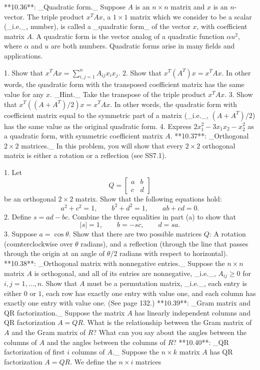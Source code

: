 

**10.36**: _Quadratic form._ Suppose \(A\) is an \(n\times n\) matrix and \(x\) is an \(n\)-vector. The triple product \(x^{T}Ax\), a \(1\times 1\) matrix which we consider to be a scalar (_i.e._, number), is called a _quadratic form_ of the vector \(x\), with coefficient matrix \(A\). A quadratic form is the vector analog of a quadratic function \(\alpha u^{2}\), where \(\alpha\) and \(u\) are both numbers. Quadratic forms arise in many fields and applications.

1. Show that \(x^{T}Ax=\sum_{i,j=1}^{n}A_{ij}x_{i}x_{j}\).
2. Show that \(x^{T}(A^{T})x=x^{T}Ax\). In other words, the quadratic form with the transposed coefficient matrix has the same value for any \(x\). _Hint._ Take the transpose of the triple product \(x^{T}Ax\).
3. Show that \(x^{T}((A+A^{T})/2)x=x^{T}Ax\). In other words, the quadratic form with coefficient matrix equal to the symmetric part of a matrix (_i.e._, \((A+A^{T})/2\)) has the same value as the original quadratic form.
4. Express \(2x_{1}^{2}-3x_{1}x_{2}-x_{2}^{2}\) as a quadratic form, with symmetric coefficient matrix \(A\).
**10.37**: _Orthogonal \(2\times 2\) matrices._ In this problem, you will show that every \(2\times 2\) orthogonal matrix is either a rotation or a reflection (see SS7.1).

1. Let \[Q=\left[\begin{array}{cc}a&b\\ c&d\end{array}\right]\] be an orthogonal \(2\times 2\) matrix. Show that the following equations hold: \[a^{2}+c^{2}=1,\qquad b^{2}+d^{2}=1,\qquad ab+cd=0.\] 2. Define \(s=ad-bc\). Combine the three equalities in part (a) to show that \[|s|=1,\qquad b=-sc,\qquad d=sa.\] 3. Suppose \(a=\cos\theta\). Show that there are two possible matrices \(Q\): A rotation (counterclockwise over \(\theta\) radians), and a reflection (through the line that passes through the origin at an angle of \(\theta/2\) radians with respect to horizontal).
**10.38**: _Orthogonal matrix with nonnegative entries._ Suppose the \(n\times n\) matrix \(A\) is orthogonal, and all of its entries are nonnegative, _i.e._, \(A_{ij}\geq 0\) for \(i,j=1,\ldots,n\). Show that \(A\) must be a permutation matrix, _i.e._, each entry is either \(0\) or \(1\), each row has exactly one entry with value one, and each column has exactly one entry with value one. (See page 132.)
**10.39**: _Gram matrix and QR factorization._ Suppose the matrix \(A\) has linearly independent columns and QR factorization \(A=QR\). What is the relationship between the Gram matrix of \(A\) and the Gram matrix of \(R\)? What can you say about the angles between the columns of \(A\) and the angles between the columns of \(R\)?
**10.40**: _QR factorization of first \(i\) columns of \(A\)._ Suppose the \(n\times k\) matrix \(A\) has QR factorization \(A=QR\). We define the \(n\times i\) matrices

